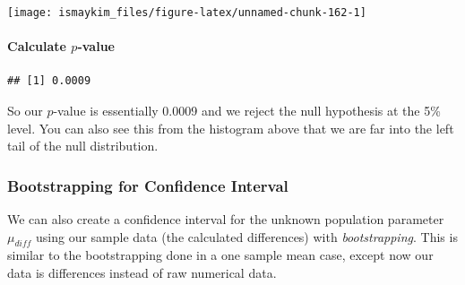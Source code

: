 \documentclass[]{tufte-book}
\newenvironment{Shaded}{\begin{snugshade}}{\end{snugshade}}
\newcommand{\KeywordTok}[1]{\textcolor[rgb]{0.13,0.29,0.53}{\textbf{{#1}}}}
\newcommand{\DataTypeTok}[1]{\textcolor[rgb]{0.13,0.29,0.53}{{#1}}}
\newcommand{\DecValTok}[1]{\textcolor[rgb]{0.00,0.00,0.81}{{#1}}}
\newcommand{\StringTok}[1]{\textcolor[rgb]{0.31,0.60,0.02}{{#1}}}
\newcommand{\OtherTok}[1]{\textcolor[rgb]{0.56,0.35,0.01}{{#1}}}
\newcommand{\NormalTok}[1]{{#1}}
\begin{document}
\begin{center}\texttt{[image: ismaykim\_files/figure-latex/unnamed-chunk-162-1]} \end{center}

\paragraph{\texorpdfstring{Calculate
\(p\)-value}{Calculate p-value}}\label{calculate-p-value-4}

\begin{Shaded}
\end{Shaded}

\begin{verbatim}
## [1] 0.0009
\end{verbatim}

So our \(p\)-value is essentially 0.0009 and we reject the null
hypothesis at the 5\% level. You can also see this from the histogram
above that we are far into the left tail of the null distribution.

\subsubsection{Bootstrapping for Confidence
Interval}\label{bootstrapping-for-confidence-interval-4}

We can also create a confidence interval for the unknown population
parameter \(\mu_{diff}\) using our sample data (the calculated
differences) with \emph{bootstrapping}. This is similar to the
bootstrapping done in a one sample mean case, except now our data is
differences instead of raw numerical data.

\begin{Shaded}
\end{Shaded}
\end{document}
